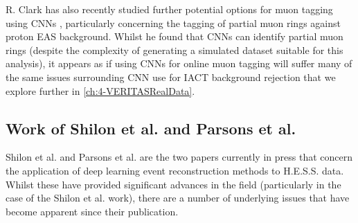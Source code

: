 R. Clark has also recently studied further potential options for muon tagging using CNNs \cite{roganthesis}, particularly concerning the tagging of partial muon rings against proton EAS background. Whilst he found that CNNs can identify partial muon rings (despite the complexity of generating a simulated dataset suitable for this analysis), it appears as if using CNNs for online muon tagging will suffer many of the same issues surrounding CNN use for IACT background rejection that we explore further in \ref{ch:4-VERITASRealData}.

\subsection{Work of Shilon et al. and Parsons et al.}
Shilon et al. \cite{Shilon} and Parsons et al. \cite{ParsonsOhm} are the two papers currently in press that concern the application of deep learning event reconstruction methods to H.E.S.S. data. Whilst these have provided significant advances in the field (particularly in the case of the Shilon et al. work), there are a number of underlying issues that have become apparent since their publication.

